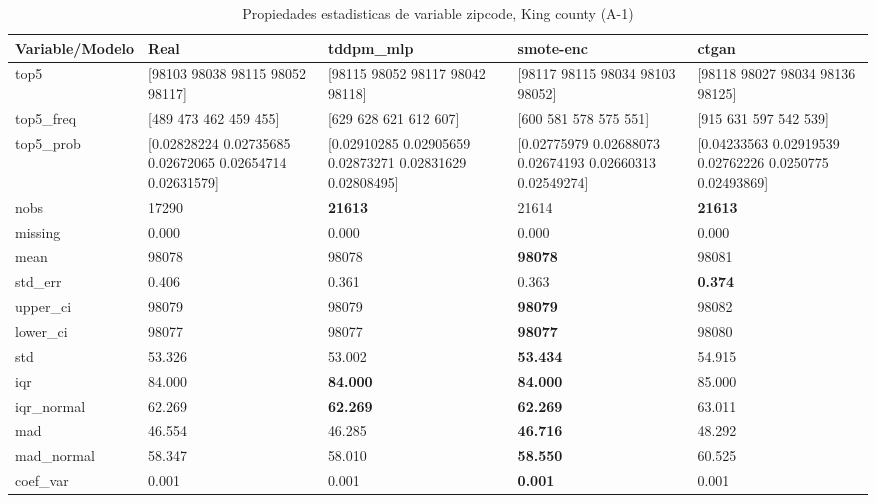 \begin{table}[H]
\centering
\fontsize{8}{14}\selectfont
\caption{Propiedades  estadisticas de variable zipcode, King county (A-1)}
\label{table-stats-king county-a-1-zipcode}
\begin{tabular}{|l|m{10em}|m{10em}|m{10em}|m{10em}|}
\hline
 \rowcolor[gray]{0.8}
Variable/Modelo & Real & tddpm\_mlp & smote-enc & ctgan \\
\hline top5 & [98103 98038 98115 98052 98117] & [98115 98052 98117 98042 98118] & [98117 98115 98034 98103 98052] & [98118 98027 98034 98136 98125] \\
\hline top5\_freq & [489 473 462 459 455] & [629 628 621 612 607] & [600 581 578 575 551] & [915 631 597 542 539] \\
\hline top5\_prob & [0.02828224 0.02735685 0.02672065 0.02654714 0.02631579] & [0.02910285 0.02905659 0.02873271 0.02831629 0.02808495] & [0.02775979 0.02688073 0.02674193 0.02660313 0.02549274] & [0.04233563 0.02919539 0.02762226 0.0250775  0.02493869] \\
\hline nobs & 17290 & \bfseries 21613 & \cellcolor[rgb]{0.9, 0.54, 0.52} 21614 & \bfseries 21613 \\
\hline missing & 0.000 & 0.000 & 0.000 & 0.000 \\
\hline mean & 98078 & 98078 & \bfseries 98078 & \cellcolor[rgb]{0.9, 0.54, 0.52} 98081 \\
\hline std\_err & 0.406 & \cellcolor[rgb]{0.9, 0.54, 0.52} 0.361 & 0.363 & \bfseries 0.374 \\
\hline upper\_ci & 98079 & 98079 & \bfseries 98079 & \cellcolor[rgb]{0.9, 0.54, 0.52} 98082 \\
\hline lower\_ci & 98077 & 98077 & \bfseries 98077 & \cellcolor[rgb]{0.9, 0.54, 0.52} 98080 \\
\hline std & 53.326 & 53.002 & \bfseries 53.434 & \cellcolor[rgb]{0.9, 0.54, 0.52} 54.915 \\
\hline iqr & 84.000 & \bfseries 84.000 & \bfseries 84.000 & \cellcolor[rgb]{0.9, 0.54, 0.52} 85.000 \\
\hline iqr\_normal & 62.269 & \bfseries 62.269 & \bfseries 62.269 & \cellcolor[rgb]{0.9, 0.54, 0.52} 63.011 \\
\hline mad & 46.554 & 46.285 & \bfseries 46.716 & \cellcolor[rgb]{0.9, 0.54, 0.52} 48.292 \\
\hline mad\_normal & 58.347 & 58.010 & \bfseries 58.550 & \cellcolor[rgb]{0.9, 0.54, 0.52} 60.525 \\
\hline coef\_var & 0.001 & 0.001 & \bfseries 0.001 & \cellcolor[rgb]{0.9, 0.54, 0.52} 0.001 \\

\end{tabular}
\end{table}

